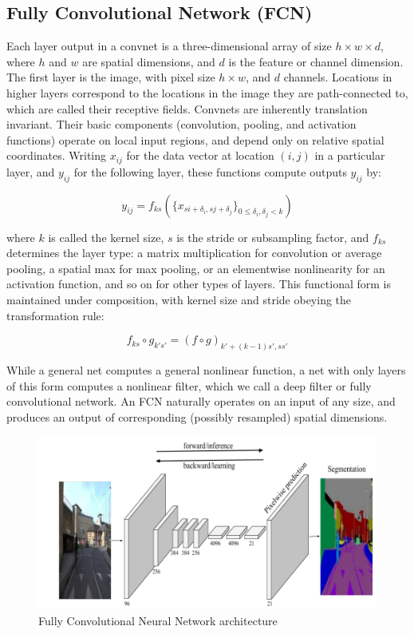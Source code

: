 \documentclass{ieeeojies}
\begin{document}
\subsection{Fully Convolutional Network (FCN)}
Each layer output in a convnet is a three-dimensional array
of size $h \times w \times d$, where $h$ and $w$ are spatial dimensions, and
$d$ is the feature or channel dimension. The first layer is the
image, with pixel size $h \times w$, and $d$ channels. Locations in
higher layers correspond to the locations in the image they
are path-connected to, which are called their receptive fields.
Convnets are inherently translation invariant. Their basic components (convolution, pooling, and activation functions) operate on local input regions, and depend only on
relative spatial coordinates. Writing $x_{ij}$ for the data vector at
location $(i, j)$ in a particular layer, and $y_{ij}$ for the following
layer, these functions compute outputs $y_{ij}$ by:

\[
y_{ij} = f_{ks} \left( \{x_{si+\delta_i, sj+\delta_j}\}_{0 \le \delta_i, \delta_j < k} \right)
\]

where $k$ is called the kernel size, $s$ is the stride or subsampling factor, and $f_{ks}$ determines the layer type: a matrix
multiplication for convolution or average pooling, a spatial
max for max pooling, or an elementwise nonlinearity for an
activation function, and so on for other types of layers.
This functional form is maintained under composition,
with kernel size and stride obeying the transformation rule:

\[
f_{ks} \circ g_{k's'} = (f \circ g)_{k' + (k-1)s', ss'}
\]

While a general net computes a general nonlinear function,
a net with only layers of this form computes a nonlinear
filter, which we call a deep filter or fully convolutional network.
An FCN naturally operates on an input of any size, and
produces an output of corresponding (possibly resampled)
spatial dimensions.\cite{Ismail}

\begin{figure}[H]
    \centering
\begin{minipage}{0.5\textwidth}
        \centering
        \includegraphics[width=\textwidth]{bibliography/Figure/FCN.png}
        \caption{Fully Convolutional Neural Network architecture}
        \label{fig:3}
\end{minipage}
\end{figure}
\end{document}
